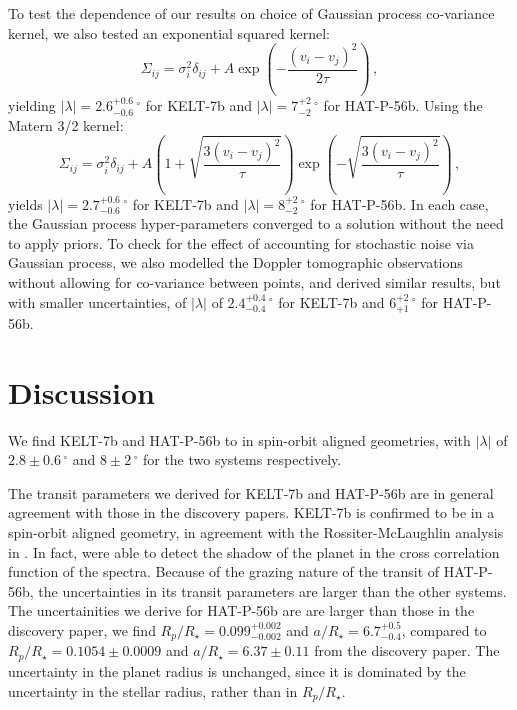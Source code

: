 \documentclass[useAMS,usenatbib]{mn2e}
\begin{document}
To test the dependence of our results on choice of Gaussian process co-variance kernel, we also tested an exponential squared kernel:
\begin{equation}
  \Sigma_{ij} = \sigma_{i}^2 \delta_{ij} + A \exp \left(- \frac{(v_{i}-v_{j})^2}{2\tau} \right)\,,
\end{equation}
yielding $|\lambda| = 2.6_{-0.6}^{+0.6}\,^\circ$ for KELT-7b and $|\lambda| = 7_{-2}^{+2}\,^\circ$ for HAT-P-56b.
Using the Matern 3/2 kernel:
\begin{equation}
  \Sigma_{ij} = \sigma_{i}^2 \delta_{ij} + A \left( 1+\sqrt{\frac{3(v_{i}-v_{j})^2}{\tau}} \right) \exp \left(-\sqrt{\frac{3 (v_{i}-v_{j})^2}{\tau}}\right)\,,
\end{equation}
yields $|\lambda| = 2.7_{-0.6}^{+0.6}\,^\circ$ for KELT-7b and $|\lambda| = 8_{-2}^{+2}\,^\circ$ for HAT-P-56b. In each case, the Gaussian process hyper-parameters converged to a solution without the need to apply priors.  To check for the effect of accounting for stochastic noise via Gaussian process, we also modelled the Doppler tomographic observations without allowing for co-variance between points, and derived similar results, but with smaller uncertainties, of $|\lambda|$ of $2.4_{-0.4}^{+0.4}\,^\circ$ for KELT-7b and $6_{+1}^{+2}\,^\circ$ for HAT-P-56b.

\section{Discussion}
\label{sec:discussion}

We find KELT-7b and HAT-P-56b to in spin-orbit aligned geometries, with $|\lambda|$ of $2.8 \pm 0.6\,^\circ$ and $8 \pm 2\,^\circ$ for the two systems respectively.

The transit parameters we derived for KELT-7b and HAT-P-56b are in general agreement with those in the discovery papers. KELT-7b is confirmed to be in a spin-orbit aligned geometry, in agreement with the Rossiter-McLaughlin analysis in \citet{2015AJ....150...12B}. In fact, \citet{2015AJ....150...12B} were able to detect the shadow of the planet in the cross correlation function of the spectra. Because of the grazing nature of the transit of HAT-P-56b, the uncertainties in its transit parameters are larger than the other systems. The uncertainities we derive for HAT-P-56b are are larger than those in the discovery paper, we find $R_p/R_\star = 0.099_{-0.002}^{+0.002}$ and $a/R_\star = 6.7_{-0.4}^{+0.5}$, compared to $R_p/R_\star = 0.1054\pm0.0009$ and $a/R_\star = 6.37\pm0.11$ from the discovery paper. The uncertainty in the planet radius is unchanged, since it is dominated by the uncertainty in the stellar radius, rather than in $R_p/R_\star$. 
\end{document}

